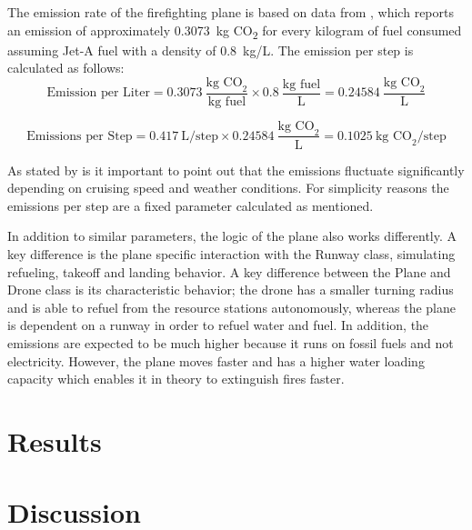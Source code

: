 \documentclass[twoside]{article}
\begin{document}
The emission rate of the firefighting plane is based on data from \citet*{spicerRapidMeasurementEmissions2009}, which reports an emission of approximately \SI{0.3073}{\kilo\gram} CO\textsubscript{2} for every kilogram of fuel consumed assuming Jet-A fuel with a density of 0.8~kg/L. The emission per step is calculated as follows: 
\[
\text{Emission per Liter}  = 0.3073~\frac{\text{kg CO}_2}{\text{kg fuel}} \times 0.8~\frac{\text{kg fuel}}{\text{L}} = 0.24584~\frac{\text{kg CO}_2}{\text{L}}
\]

\[
\text{Emissions per Step} = 0.417~\text{L/step} \times 0.24584~\frac{\text{kg CO}_2}{\text{L}} = 0.1025~\text{kg CO}_2/\text{step}
\]


As stated by \citet*{spicerRapidMeasurementEmissions2009} is it important to point out that the emissions fluctuate significantly depending on cruising speed and weather conditions. For simplicity reasons the emissions per step are a fixed parameter calculated as mentioned.

In addition to similar parameters, the logic of the plane also works differently. A key difference is the plane specific interaction with the Runway class, simulating refueling, takeoff and landing behavior. A key difference between the Plane and Drone class is its characteristic behavior; the drone has a smaller turning radius and is able to refuel from the resource stations autonomously, whereas the plane is dependent on a runway in order to refuel water and fuel. In addition, the emissions are expected to be much higher because it runs on fossil fuels and not electricity. However, the plane moves faster and has a higher water loading capacity which enables it in theory to extinguish fires faster. 




\section{Results}
\section{Discussion}





\end{document}
